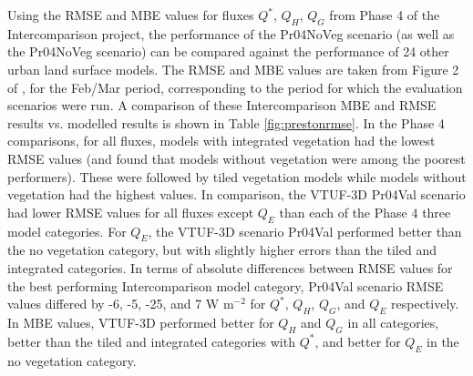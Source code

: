 \documentclass[final,3p,times,authoryear]{elsarticle}
\begin{document}
Using the RMSE and MBE values for fluxes $Q^{*}$, $Q_{H}$, $Q_{G}$ from Phase 4 of the Intercomparison project, the performance of the Pr04NoVeg scenario (as well as the Pr04NoVeg scenario) can be compared against the performance of 24 other urban land surface models. The RMSE and MBE values are taken from Figure 2 of \cite{Best2012}, for the Feb/Mar period, corresponding to the period for which the evaluation scenarios were run. A comparison of these Intercomparison MBE and RMSE results vs. modelled results is shown in Table \ref{fig:prestonrmse}. In the Phase 4 comparisons, for all fluxes, models with integrated vegetation had the lowest RMSE values (and \cite{Grimmond2011} found that models without vegetation were among the poorest performers). These were followed by tiled vegetation models while models without vegetation had the highest values. In comparison, the VTUF-3D Pr04Val scenario had lower RMSE values for all fluxes except $Q_{E}$ than each of the Phase 4 three model categories. For $Q_{E}$, the VTUF-3D scenario Pr04Val performed better than the no vegetation category, but with slightly higher errors than the tiled and integrated categories. In terms of absolute differences between RMSE values for the best performing Intercomparison model category, Pr04Val scenario RMSE values differed by -6, -5, -25, and 7 W m$^{-2}$ for $Q^{*}$, $Q_{H}$, $Q_{G}$, and $Q_{E}$ respectively. In MBE values, VTUF-3D performed better for $Q_{H}$ and $Q_{G}$ in all categories, better than the tiled and integrated categories with $Q^{*}$, and better for $Q_{E}$ in the no vegetation category.
\end{document}
